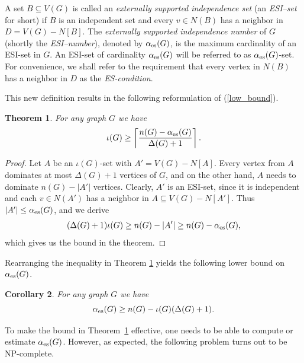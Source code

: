\documentclass[11pt]{article}
\newtheorem{theorem}{Theorem}
\newtheorem{corollary}[theorem]{Corollary}
\newcommand{\io}{\iota}
\newcommand{\es}{\alpha_{\rm es}}
\begin{document}
\medskip

A set $B \subseteq V(G)$ is called an \emph{externally supported independence set} (an \textit{ESI--set} for short) if $B$ is an independent set and every $v\in N(B)$ has a neighbor in $D=V(G)-N[B]$. The \emph{externally supported independence number} of $G$ (shortly the \emph{ESI--number}), denoted by $\es(G)$, is the maximum cardinality of an ESI-set in $G$. An ESI-set of cardinality $\es(G)$ will be referred to as $\es(G)$-set. For convenience, we shall refer to the requirement that every vertex in $N(B)$ has a neighbor in $D$ as the \emph{ES-condition}. 

This new definition results in the following reformulation of (\ref{low_bound}).

\begin{theorem} 
\label{gen_bound}
For any graph $G$ we have 
$$\io(G)\geq \left\lceil\frac{n(G)-\es(G)}{\Delta(G)+1}\right\rceil.$$ 
\end{theorem}

\begin{proof}
Let $A$ be an $\io(G)$-set with $A'=V(G)-N[A]$.
Every vertex from $A$ dominates at most $\Delta(G)+1$ vertices of $G$, and on the other hand, $A$ needs to dominate $n(G)-|A'|$ vertices. 
Clearly, $A'$ is an ESI-set, since it is independent and each $v\in N(A')$ has a neighbor in
$A\subseteq V(G)-N[A']$. Thus $|A'|\le \es(G)$, and
we derive
$$(\Delta(G)+1)\io(G)\geq n(G)-|A'|\geq n(G)-\es(G),$$
which gives us the bound in the theorem. 
\end{proof}


Rearranging the inequality in Theorem \ref{gen_bound} yields the following lower bound on $\es(G)$.

\begin{corollary} 
\label{alpha-bound}
For any graph $G$ we have 
$$\es(G)\geq n(G)-\io(G)(\Delta(G)+1).$$
\end{corollary}

To make the bound in Theorem~\ref{gen_bound} effective, one needs to be able to compute or
estimate $\es(G)$. However, as expected, the following problem turns out to be NP-complete.

\begin{center}
\end{center}
\end{document}
